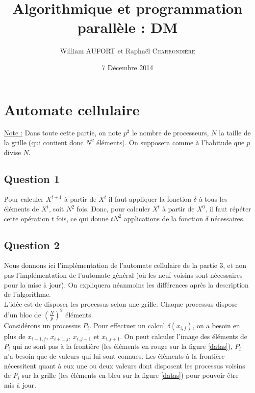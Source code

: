 \documentclass{article}
\title{Algorithmique et programmation parallèle : DM}
\author{William \textsc{AUFORT} et Raphaël \textsc{Charrondière}}
\date{7 Décembre 2014}
\newcommand{\X}[1]{{X}^{ #1 }}
\begin{document}
\maketitle

\section{Automate cellulaire}

\underline{Note :} Dans toute cette partie, on note $p^2$ le nombre de processeurs, $N$ la taille de la grille (qui contient donc $N^2$ éléments).
On supposera comme à l'habitude que $p$ divise $N$.

\subsection*{Question 1}

Pour calculer $\X{t+1}$ à partir de $\X{t}$ il faut appliquer la fonction $\delta$ à tous les éléments de $\X{t}$, soit $N^2$ fois.
Donc, pour calculer $\X{t}$ à partir de $\X{0}$, il faut répéter cette opération $t$ fois, ce qui donne $t N^2$ applications de la fonction $\delta$ nécessaires.

\subsection*{Question 2}

Nous donnons ici l'implémentation de l'automate cellulaire de la partie 3, et non pas l'implémentation de l'automate général (où les neuf voisins sont nécessaires pour la mise à jour). On expliquera néanmoins les différences après la description de l'algorithme. \\

L'idée est de disposer les processus selon une grille. Chaque processus dispose d'un bloc de $\left( \frac{N}{p} \right) ^2$ éléments.\\

Considérons un processus $P_i$. 
Pour effectuer un calcul $\delta(x_{i,j})$, on a besoin en plus de $x_{i-1,j}$, $x_{i+1,j}$, $x_{i,j-1}$ et $x_{i,j+1}$.
On peut calculer l'image des éléments de $P_i$ qui ne sont pas à la frontière (les éléments en rouge sur la figure \ref{datas}), $P_i$ n'a besoin que de valeurs qui lui sont connues.
Les éléments à la frontière nécessitent quant à eux une ou deux valeurs dont disposent les processus voisins de $P_i$ sur la grille (les éléments en bleu sur la figure \ref{datas}) pour pouvoir être mis à jour.
\end{document}
